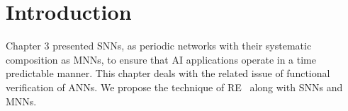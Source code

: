 \section{Introduction}
\label{sec:intro2}

Chapter 3 presented \acfp{SNN}, as periodic networks with their systematic composition as \acfp{MNN}, to ensure that \ac{AI} applications operate in a time predictable manner.
This chapter deals with the related issue of functional verification of \acp{ANN}.
We propose the technique of \acf{RE}~\cite{recps} along with \acp{SNN} and \acp{MNN}.
